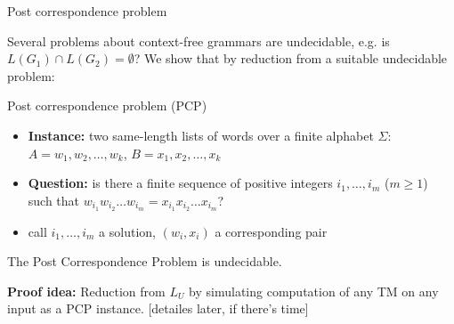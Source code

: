 \documentclass[handout]{beamer}
\begin{document}
\begin{frame}{Post correspondence problem}

    \vspace{-4pt}
    Several problems about context-free grammars are undecidable, e.g. is $L(G_1)\cap L(G_2)=\emptyset$? We show that by reduction from a suitable undecidable problem:
    
    \begin{block}{Post correspondence problem (PCP)}
        \begin{itemize}
            \item \textbf{Instance:} two same-length lists of words over a finite alphabet $\Sigma$: \alert{$A=w_1,w_2,\ldots, w_k$}, \alert{$B=x_1,x_2,\ldots, x_k$}
            \item \textbf{Question:} is there a finite sequence of positive integers $i_1,\dots,i_m$ ($m\geq 1$) such that \alert{$w_{i_1} w_{i_2} \ldots w_{i_m}=x_{i_1} x_{i_2} \ldots x_{i_m}$}?
            \item call $i_1,\dots,i_m$ a \alert{solution}, $(w_i,x_i)$ a \alert{corresponding} pair
        \end{itemize}
    \end{block}
   

    \begin{theorem}
        The Post Correspondence Problem is undecidable.
    \end{theorem}
    \vspace{-8pt}
    \textbf{Proof idea:} Reduction from $L_U$ by simulating computation of any TM on any input as a PCP instance. [detailes later, if there's time]

\end{frame}
\end{document}
